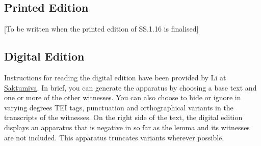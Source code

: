 \subsection{Printed Edition}
[To be written when the printed edition of SS.1.16 is finalised]

\subsection{Digital Edition}
Instructions for reading the digital edition have been provided by  Li at 
\href{https://saktumiva.org/wiki/users}{Saktumiva}. In brief, you can 
generate the apparatus by choosing a base text and one or more of the other 
witnesses. You can also choose to hide or ignore in varying degrees TEI 
tags, punctuation and orthographical variants in the transcripts of the witnesses. 
On the right side of the text, the digital edition displays an apparatus that is 
negative in so far as the lemma and its witnesses are not included. This apparatus 
truncates variants wherever possible. 

